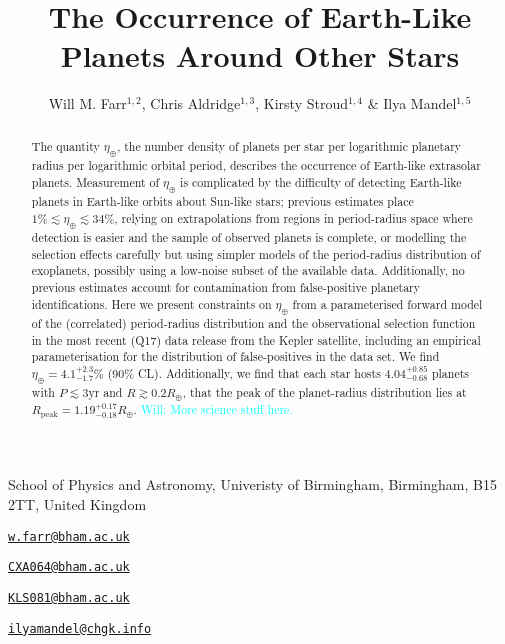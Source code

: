 \documentclass{nature}
\newcommand{\etaearth}{\eta_\oplus}
\newcommand{\Rpeak}{R_\mathrm{peak}}
\newcommand{\REarth}{R_\oplus}
\newcommand{\email}[1]{\href{mailto:#1}{\nolinkurl{#1}}}
\newcommand{\Will}[1]{\textcolor{cyan}{Will: #1}}
\begin{document}
\title{The Occurrence of Earth-Like Planets Around Other Stars}

\author{Will M. Farr$^{1,2}$, Chris Aldridge$^{1,3}$, Kirsty Stroud$^{1,4}$ \& Ilya Mandel$^{1,5}$}

\maketitle

\begin{affiliations}
\item School of Physics and Astronomy, Univeristy of Birmingham, Birmingham, B15 2TT, United Kingdom
\item \email{w.farr@bham.ac.uk}
\item \email{CXA064@bham.ac.uk}
\item \email{KLS081@bham.ac.uk}
\item \email{ilyamandel@chgk.info}
\end{affiliations}

\begin{abstract}
  The quantity $\etaearth$, the number density of planets per star per
  logarithmic planetary radius per logarithmic orbital period,
  describes the occurrence of Earth-like extrasolar planets.
  Measurement of $\etaearth$ is complicated by the difficulty of
  detecting Earth-like planets in Earth-like orbits about Sun-like
  stars; previous estimates place $1\% \lesssim \etaearth \lesssim
  34\%$, relying on extrapolations from regions in period-radius space
  where detection is easier and the sample of observed planets is
  complete\cite{2011ApJ...738...81W,2011ApJ...738..151C,2012ApJ...745...20T},
  or modelling the selection effects carefully but using simpler
  models of the period-radius distribution of
  exoplanets\cite{2013ApJ...778...53D}, possibly using a low-noise
  subset of the available data\cite{2013PNAS..11019273P}.
  Additionally, no previous estimates account for contamination from
  false-positive planetary identifications.  Here we present
  constraints on $\etaearth$ from a parameterised forward model of the
  (correlated) period-radius distribution and the observational
  selection function in the most recent (Q17) data release from the
  Kepler
  satellite\cite{2010Sci...327..977B,2011ApJ...736...19B,2013ApJS..204...24B},
  including an empirical parameterisation for the distribution of
  false-positives in the data set.  We find $\etaearth =
  4.1^{+2.3}_{-1.7}\%$ (90\% CL).  Additionally, we find that each
  star hosts $4.04_{-0.68}^{+0.85}$ planets with $P \lesssim 3
  \mathrm{yr}$ and $R \gtrsim 0.2 \REarth$, that the peak of the
  planet-radius distribution lies at $\Rpeak = 1.19_{-0.18}^{+0.17}
  \REarth$.  \Will{More science stuff here.}
\end{abstract}
\end{document}
